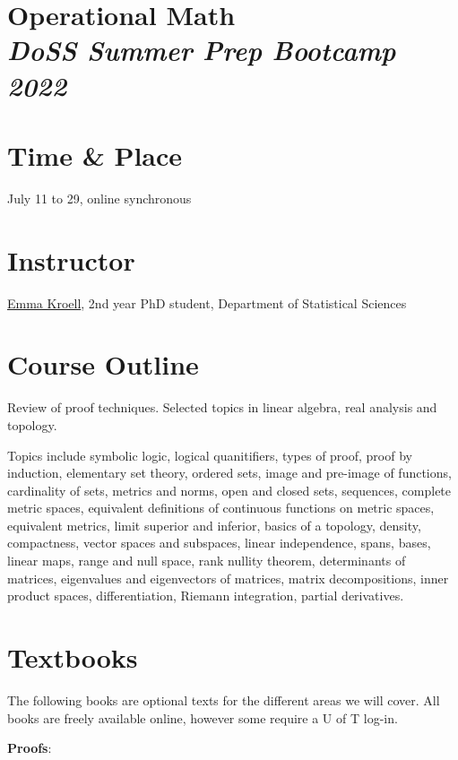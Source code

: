\documentclass[12pt]{article}
\date{ }
\begin{document}
\section*{Operational Math\\  {\it{DoSS Summer Prep Bootcamp 2022}}}

\section{Time \& Place}
July 11 to 29, online synchronous

\section{Instructor}
\href{https://www.emmakroell.ca}{Emma Kroell}, 2nd year PhD student, Department of Statistical Sciences


\section{Course Outline}
Review of proof techniques. Selected topics in linear algebra, real analysis and topology. 

\vspace{1em}

\noindent
Topics include symbolic logic, logical quanitifiers, types of proof, proof by induction, elementary set theory, ordered sets, image and pre-image of functions, cardinality of sets, metrics and norms, open and closed sets, sequences, complete metric spaces, equivalent definitions of continuous functions on metric spaces, equivalent metrics, limit superior and inferior, basics of a topology, density, compactness, vector spaces and subspaces, linear independence, spans, bases, linear maps, range and null space, rank nullity theorem, determinants of matrices, eigenvalues and eigenvectors of matrices, matrix decompositions, inner product spaces, differentiation, Riemann integration, partial derivatives.

\section{Textbooks}
The following books are optional texts for the different areas we will cover. All books are freely available online, however some require a U of T log-in.

\vspace{1em}

\noindent
{\bf{Proofs}}:
\vspace{0.1cm}
\end{document}
